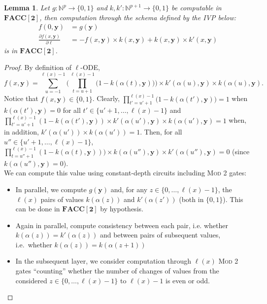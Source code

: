 \documentclass[11pt, oneside]{article}
\newenvironment{toappendix}{}{}
\newcommand{\Nat}{\mathbb{N}}
\newcommand{\FACC}{\mathbf{FACC[2]}}
\newcommand{\tu}[1]{\mathbf{#1}}
\newtheorem{lemma}{Lemma}
\theoremstyle{definition}
\begin{document}
\begin{toappendix}
\begin{lemma}\label{lemma:kkODE}
    Let $g:\Nat^p\to \{0,1\}$ and $k, k':\Nat^{p+1}\to \{0,1\}$ be computable in $\FACC$, then computation through the schema defined by the IVP below:
    \begin{align*}
        f(0, \tu y) &= g(\tu y) \\
        \frac{\partial f(x, \tu y)}{\partial \ell} &= - f(x, \tu y) \times k(x, \tu y) + k(x, \tu y) \times k'(x, \tu y)
    \end{align*}
    is in $\FACC$.
\end{lemma}

    
\begin{proof}
By definition of $\ell$-ODE,
$$
f(x, \tu y) = \sum^{\ell(x)-1}_{u=-1} \Bigg(\prod^{\ell(x)-1}_{t=u+1} \Big(1-k(\alpha(t), \tu y)\Big) \Bigg) \times k'(\alpha(u), \tu y) \times k(\alpha(u), \tu y).
$$
Notice that $f(x, \tu y)\in \{0,1\}$.
%
Clearly, $\prod^{\ell(x)-1}_{t'=u'+1}\big(1-k(\alpha(t'), \tu y)\big)=1$ when $k(\alpha(t'), \tu y)=0$ for all $t'\in \{u'+1, \dots, \ell(x)-1\}$ and $\prod^{\ell(x)-1}_{t'=u'+1}(1-k(\alpha(t'), \tu y))\times k'(\alpha(u'), \tu y) \times k(\alpha(u'), \tu y) =1$ when, in addition, $k'(\alpha(u')) \times k(\alpha(u'))=1$.
%
Then, for all $u''\in \{u'+1, \dots, \ell(x)-1\}$, $\prod^{\ell(x)-1}_{t=u''+1} (1-k(\alpha(t), \tu y)) \big) \times k(\alpha(u''), \tu y) \times k'(\alpha(u''), \tu y)=0$ (since $k(\alpha(u''),\tu y)=0$).
\\
We can compute this value using constant-depth circuits including %
\textsc{Mod 2} gates:
%
\begin{itemize}
    \itemsep0em
    \item In parallel, we compute $g(\tu y)$ and, for any $z\in \{0, \dots, \ell(x)-1\}$, the $\ell(x)$ pairs of values $k(\alpha(z))$ and $k'(\alpha(z'))$ (both in $\{0,1\}$).
    This can be done in $\FACC$ by hypothesis.
    \item Again in parallel, compute consistency between each pair, i.e. whether $k(\alpha(z)) = k'(\alpha(z))$ and between pairs of subsequent values, i.e.~whether $k(\alpha(z))=k(\alpha(z+1))$
    \item In the subsequent layer, we consider computation through $\ell(x)$ \textsc{Mod 2} gates ``counting'' whether the number of changes of values from the considered $z\in \{0, \dots, \ell(x)-1\}$ to $\ell(x)-1$ is even or odd.

\end{itemize}
\end{proof}
\end{toappendix}
\end{document}
